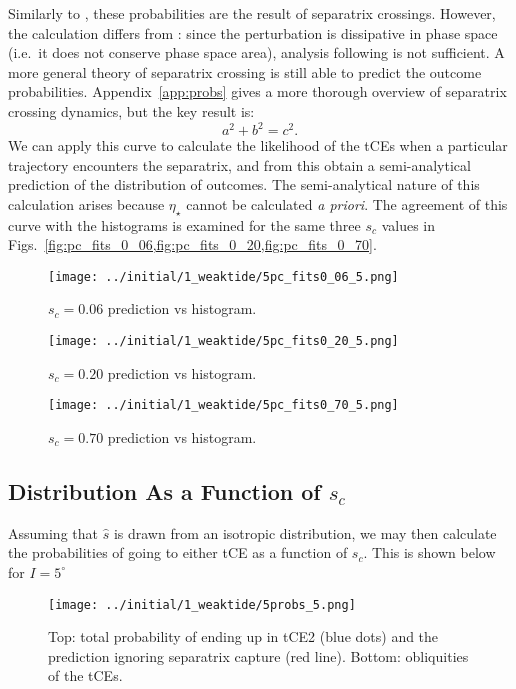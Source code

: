 \documentclass[twocolumn]{aastex63}
\begin{document}
Similarly to \citet{su2020}, these probabilities are the result of separatrix
crossings. However, the calculation differs from \citet{su2020}: since the
perturbation is dissipative in phase space (i.e.\ it does not conserve phase
space area), analysis following \citet{henrard1982} is not sufficient. A more
general theory of separatrix crossing is still able to predict the outcome
probabilities. Appendix~\ref{app:probs} gives a more thorough overview of
separatrix crossing dynamics, but the key result is:
\begin{equation}
    a^2 + b^2 = c^2.
\end{equation}
We can apply this curve to calculate the likelihood of the tCEs when a
particular trajectory encounters the separatrix, and from this obtain a
semi-analytical prediction of the distribution of outcomes. The semi-analytical
nature of this calculation arises because $\eta_\star$ cannot be calculated
\emph{a priori}. The agreement of this curve with the histograms is examined for
the same three $s_c$ values in
Figs.~\ref{fig:pc_fits_0_06,fig:pc_fits_0_20,fig:pc_fits_0_70}.
\begin{figure}
    \centering
    \texttt{[image: ../initial/1\_weaktide/5pc\_fits0\_06\_5.png]}
    \caption{$s_c = 0.06$ prediction vs histogram.}\label{fig:pc_fits_0_06}
\end{figure}
\begin{figure}
    \centering
    \texttt{[image: ../initial/1\_weaktide/5pc\_fits0\_20\_5.png]}
    \caption{$s_c = 0.20$ prediction vs histogram.}\label{fig:pc_fits_0_20}
\end{figure}
\begin{figure}
    \centering
    \texttt{[image: ../initial/1\_weaktide/5pc\_fits0\_70\_5.png]}
    \caption{$s_c = 0.70$ prediction vs histogram.}\label{fig:pc_fits_0_70}
\end{figure}

\subsection{Distribution As a Function of $s_c$}\label{ss:s_c_dist}

Assuming that $\hat{s}$ is drawn from an isotropic distribution, we may then
calculate the probabilities of going to either tCE as a function of $s_c$. This
is shown below for $I = 5^\circ$
\begin{figure}
    \centering
    \texttt{[image: ../initial/1\_weaktide/5probs\_5.png]}
    \caption{Top: total probability of ending up in tCE2 (blue dots) and the
    prediction ignoring separatrix capture (red line). Bottom:
    obliquities of the tCEs.}\label{fig:probs}
\end{figure}
\end{document}
